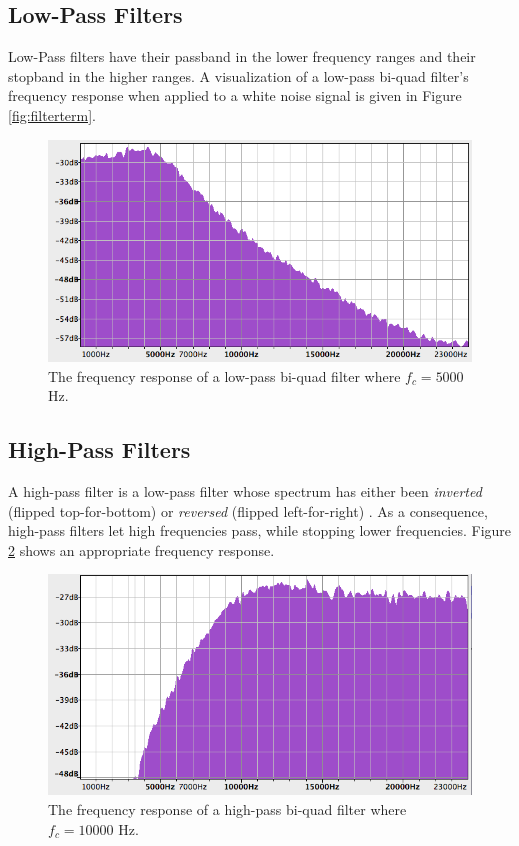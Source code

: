 \pagebreak

\subsection{Low-Pass Filters}

Low-Pass filters have their passband in the lower frequency ranges and their stopband in the higher ranges. A visualization of a low-pass bi-quad filter's frequency response when applied to a white noise signal\footnotemark{} is given in Figure \ref{fig:filterterm}.

\begin{figure}[p!]
  \includegraphics[scale=0.6]{img/lowpass}
  \caption{The frequency response of a low-pass bi-quad filter where $f_{c} = 5000$ Hz.}
  \label{fig:lowpass}
\end{figure}


\subsection{High-Pass Filters}

A high-pass filter is a low-pass filter whose spectrum has either been \emph{inverted} (flipped top-for-bottom) or \emph{reversed} (flipped left-for-right) . As a consequence, high-pass filters let high frequencies pass, while stopping lower frequencies. Figure \ref{fig:highpass} shows an appropriate frequency response.

\begin{figure}[p!]
  \includegraphics[scale=0.6]{img/highpass}
  \caption{The frequency response of a high-pass bi-quad filter where $f_{c} = 10000$ Hz.}
  \label{fig:highpass}
\end{figure}

